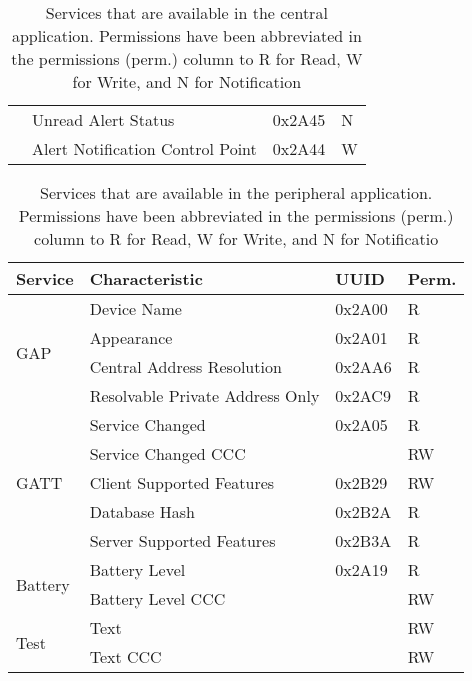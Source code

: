 \begin{table}[H]
\begin{tabular}{|l|l|l|l|}
                          & Unread Alert Status                        & 0x2A45        & N              \\ \cline{2-4} 
                          & Alert Notification Control Point           & 0x2A44        & W              \\ \hline
    \end{tabular}
    \caption{Services that are available in the central application. Permissions have been abbreviated in the permissions (perm.) column to R for Read, W for Write, and N for Notification}
    \label{tbl:services_central}
\end{table}

\begin{table}[H]
    \centering
    \begin{tabular}{|l|l|l|l|}
        \hline
    \textbf{Service}         & \textbf{Characteristic}         & \textbf{UUID} & \textbf{Perm.}  \\ \hline
    \multirow{4}{*}{GAP}     & Device Name                     & 0x2A00        & R               \\ \cline{2-4} 
                             & Appearance                      & 0x2A01        & R               \\ \cline{2-4} 
                             & Central Address Resolution      & 0x2AA6        & R               \\ \cline{2-4} 
                             & Resolvable Private Address Only & 0x2AC9        & R               \\ \hline
    \multirow{5}{*}{GATT}    & Service Changed                 & 0x2A05        & R               \\ \cline{2-4} 
                             & Service Changed CCC             &               & RW              \\ \cline{2-4} 
                             & Client Supported Features       & 0x2B29        & RW              \\ \cline{2-4} 
                             & Database Hash                   & 0x2B2A        & R               \\ \cline{2-4} 
                             & Server Supported Features       & 0x2B3A        & R               \\ \hline
    \multirow{2}{*}{Battery} & Battery Level                   & 0x2A19        & R               \\ \cline{2-4} 
                             & Battery Level CCC               &               & RW              \\ \hline
    \multirow{2}{*}{Test}    & Text                            &               & RW              \\ \cline{2-4} 
                             & Text CCC                        &               & RW              \\ \hline
    \end{tabular}
    \caption{Services that are available in the peripheral application. Permissions have been abbreviated in the permissions (perm.) column to R for Read, W for Write, and N for Notificatio}
    \label{tbl:services_peripheral}
\end{table}

